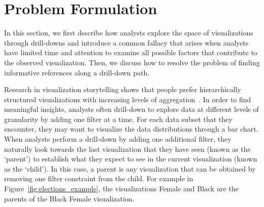 \section{Problem Formulation\label{sec:datamodel}}
\par In this section, we first describe how analysts explore the space of visualizations through drill-downs and introduce a common fallacy that arises when analysts have limited time and attention to examine all possible factors that contribute to the observed visualization. Then, we discuss how to resolve the problem of finding informative references along a drill-down path.
\par Research in visualization storytelling shows that people prefer hierarchically structured visualizations with increasing levels of aggregation~\cite{Kim2017,Hullman2017,Hullman2013}. In order to find meaningful insights, analysts often drill-down to explore data at different levels of granularity by adding one filter at a time. For each data subset that they encounter, they may want to visualize the data distributions through a bar chart. When analysts perform a drill-down by adding one additional filter, they naturally look towards the last visualization that they have seen (known as the `parent') to establish what they expect to see in the current visualization (known as the `child'). In this case, a parent is any visualization that can be obtained by removing one filter constraint from the child. For example in Figure~\ref{fig:elections_example}, the visualizations Female and Black are the parents of the Black Female visualization. %


